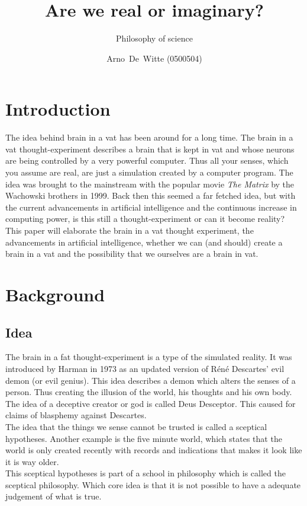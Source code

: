 \documentclass[a4paper]{article}
\author{Arno~De~Witte (0500504)}
\title{Are we real or imaginary?}
\subtitle{Philosophy of science}
\begin{document}
\makeassignment
\section{Introduction}
The idea behind brain in a vat has been around for a long time. The brain in a vat thought-experiment describes a brain that is kept in vat and whose neurons are being controlled by a very powerful computer. Thus all your senses, which you assume are real, are just a simulation created by a computer program. The idea was brought to the mainstream with the popular movie \emph{The Matrix} by the Wachowski brothers in 1999. Back then this seemed a far fetched idea, but with the current advancements in artificial intelligence and the continuous increase in computing power, is this still a thought-experiment or can it become reality?\\

This paper will elaborate the brain in a vat thought experiment, the advancements in artificial intelligence, whether we can (and should) create a brain in a vat and the possibility that we ourselves are a brain in vat.

\section{Background}
\subsection{Idea}
The brain in a fat thought-experiment is a type of the simulated reality. It was introduced by Harman \cite{Harman15} in 1973 as an updated version of Réné Descartes' evil demon (or evil genius). This idea describes a demon which alters the senses of a person. Thus creating the illusion of the world, his thoughts and his own body. The idea of a deceptive creator or god is called Deus Desceptor. This caused for claims of blasphemy against Descartes.\\

The idea that the things we sense cannot be trusted is called a sceptical hypotheses. Another example is the five minute world, which states that the world is only created recently with records and indications that makes it look like it is way older.\\
This sceptical hypotheses is part of a school in philosophy which is called the sceptical philosophy. Which core idea is that it is not possible to have a adequate judgement of what is true.
\end{document}
